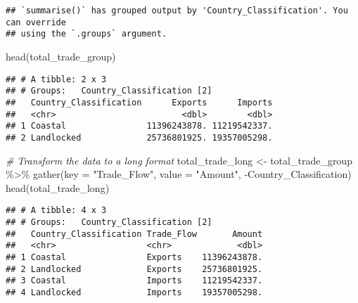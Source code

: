 \documentclass[
]{article}
\newenvironment{Shaded}{\begin{snugshade}}{\end{snugshade}}
\newcommand{\AttributeTok}[1]{\textcolor[rgb]{0.77,0.63,0.00}{#1}}
\newcommand{\CommentTok}[1]{\textcolor[rgb]{0.56,0.35,0.01}{\textit{#1}}}
\newcommand{\FunctionTok}[1]{\textcolor[rgb]{0.00,0.00,0.00}{#1}}
\newcommand{\NormalTok}[1]{#1}
\newcommand{\OtherTok}[1]{\textcolor[rgb]{0.56,0.35,0.01}{#1}}
\newcommand{\SpecialCharTok}[1]{\textcolor[rgb]{0.00,0.00,0.00}{#1}}
\newcommand{\StringTok}[1]{\textcolor[rgb]{0.31,0.60,0.02}{#1}}
\begin{document}
\begin{verbatim}
## `summarise()` has grouped output by 'Country_Classification'. You can override
## using the `.groups` argument.
\end{verbatim}

\begin{Shaded}
\begin{Highlighting}[]
\FunctionTok{head}\NormalTok{(total\_trade\_group)}
\end{Highlighting}
\end{Shaded}

\begin{verbatim}
## # A tibble: 2 x 3
## # Groups:   Country_Classification [2]
##   Country_Classification      Exports      Imports
##   <chr>                         <dbl>        <dbl>
## 1 Coastal                11396243878. 11219542337.
## 2 Landlocked             25736801925. 19357005298.
\end{verbatim}

\begin{Shaded}
\begin{Highlighting}[]
\CommentTok{\# Transform the data to a long format}
\NormalTok{total\_trade\_long }\OtherTok{\textless{}{-}}\NormalTok{ total\_trade\_group }\SpecialCharTok{\%\textgreater{}\%}
  \FunctionTok{gather}\NormalTok{(}\AttributeTok{key =} \StringTok{"Trade\_Flow"}\NormalTok{, }\AttributeTok{value =} \StringTok{"Amount"}\NormalTok{, }\SpecialCharTok{{-}}\NormalTok{Country\_Classification)}
\FunctionTok{head}\NormalTok{(total\_trade\_long)}
\end{Highlighting}
\end{Shaded}

\begin{verbatim}
## # A tibble: 4 x 3
## # Groups:   Country_Classification [2]
##   Country_Classification Trade_Flow       Amount
##   <chr>                  <chr>             <dbl>
## 1 Coastal                Exports    11396243878.
## 2 Landlocked             Exports    25736801925.
## 3 Coastal                Imports    11219542337.
## 4 Landlocked             Imports    19357005298.
\end{verbatim}
\end{document}
